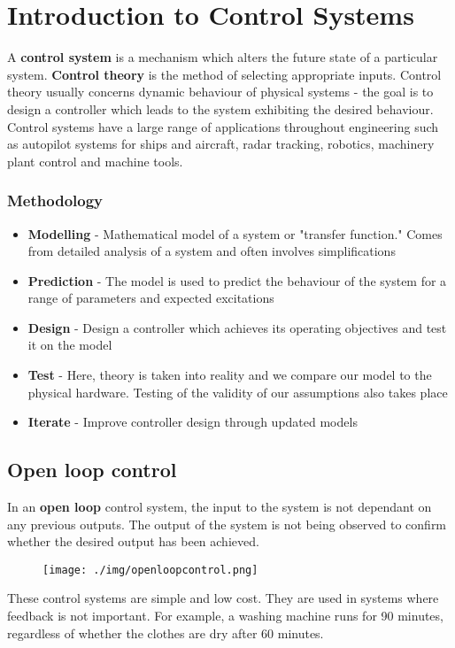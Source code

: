 \chapter{Introduction to Control Systems}
A \textbf{control system} is a mechanism which alters the future state of a particular system. \textbf{Control theory} is the method of selecting appropriate inputs. Control theory usually concerns dynamic behaviour of physical systems - the goal is to design a controller which leads to the system exhibiting the desired behaviour. Control systems have a large range of applications throughout engineering such as autopilot systems for ships and aircraft, radar tracking, robotics, machinery plant control and machine tools.
\subsection*{Methodology}
\begin{itemize}
  \item \textbf{Modelling} - Mathematical model of a system or "transfer function." Comes from detailed analysis of a system and often involves simplifications
  \item \textbf{Prediction} - The model is used to predict the behaviour of the system for a range of parameters and expected excitations
  \item \textbf{Design} - Design a controller which achieves its operating objectives and test it on the model
  \item \textbf{Test} - Here, theory is taken into reality and we compare our model to the physical hardware. Testing of the validity of our assumptions also takes place
  \item \textbf{Iterate} - Improve controller design through updated models
\end{itemize}
\section{Open loop control}
In an \textbf{open loop} control system, the input to the system is not dependant on any previous outputs. The output of the system is not being observed to confirm whether the desired output has been achieved.
\begin{figure}[H]
  \centering
  \texttt{[image: ./img/openloopcontrol.png]}
\end{figure}
These control systems are simple and low cost. They are used in systems where feedback is not important. For example, a washing machine runs for 90 minutes, regardless of whether the clothes are dry after 60 minutes.
